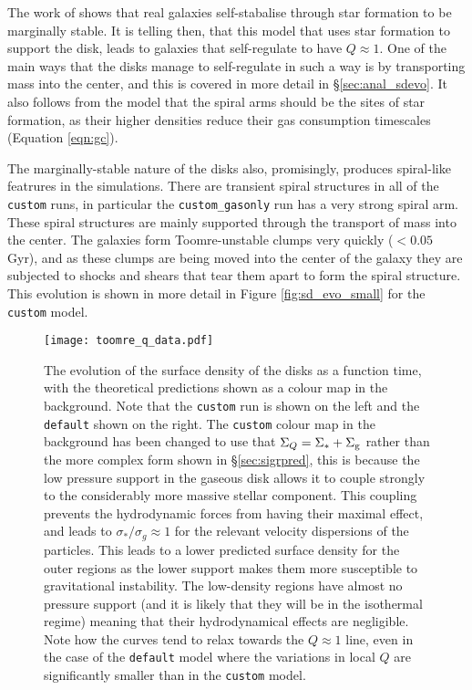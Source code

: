 The work of \citet{hopkins_stellar_2012} shows that real galaxies self-stabalise through star formation to be marginally stable.
It is telling then, that this model that uses star formation to support the disk, leads to galaxies that self-regulate to have $Q\approx1$.
One of the main ways that the disks manage to self-regulate in such a way is by transporting mass into the center, and this is covered in more detail in \S \ref{sec:anal_sdevo}.
It also follows from the model that the spiral arms should be the sites of star formation, as their higher densities reduce their gas consumption timescales (Equation \ref{eqn:gc}).

The marginally-stable nature of the disks also, promisingly, produces spiral-like featrures in the simulations.
There are transient spiral structures in all of the {\tt custom} runs, in particular the {\tt custom\_gasonly} run has a very strong spiral arm.
These spiral structures are mainly supported through the transport of mass into the center.
The galaxies form Toomre-unstable clumps very quickly ($<0.05$ Gyr), and as these clumps are being moved into the center of the galaxy they are subjected to shocks and shears that tear them apart to form the spiral structure.
This evolution is shown in more detail in Figure \ref{fig:sd_evo_small} for the {\tt custom} model.

\begin{figure}
    \centering
    \texttt{[image: toomre\_q\_data.pdf]}
    \caption{The evolution of the surface density of the disks as a function time, with the theoretical predictions shown as a colour map in the background. Note that the {\tt custom} run is shown on the left and the {\tt default} shown on the right. The {\tt custom} colour map in the background has been changed to use that $\Sigma_Q = \Sigma_* + \Sigma_\mathrm{g}$ rather than the more complex form shown in \S \ref{sec:sigrpred}, this is because the low pressure support in the gaseous disk allows it to couple strongly to the considerably more massive stellar component. This coupling prevents the hydrodynamic forces from having their maximal effect, and leads to $\sigma_*/\sigma_g \approx 1$ for the relevant velocity dispersions of the particles. This leads to a lower predicted surface density for the outer regions as the lower support makes them more susceptible to gravitational instability. The low-density regions have almost no pressure support (and it is likely that they will be in the isothermal regime) meaning that their hydrodynamical effects are negligible. Note how the curves tend to relax towards the $Q\approx1$ line, even in the case of the {\tt default} model where the variations in local $Q$ are significantly smaller than in the {\tt custom} model.}
    \label{fig:toomreqthr_dat}
\end{figure}

